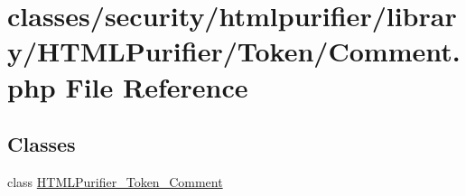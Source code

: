 \hypertarget{Comment_8php}{\section{classes/security/htmlpurifier/library/\+H\+T\+M\+L\+Purifier/\+Token/\+Comment.php File Reference}
\label{Comment_8php}
}
\subsection*{Classes}
\begin{DoxyCompactItemize}
\item 
class \hyperlink{classHTMLPurifier__Token__Comment}{H\+T\+M\+L\+Purifier\+\_\+\+Token\+\_\+\+Comment}
\end{DoxyCompactItemize}
